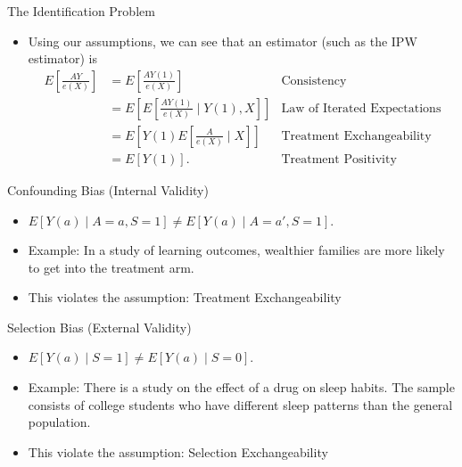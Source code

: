 \documentclass[handout]{beamer} %
\begin{document}
\begin{frame}{The Identification Problem}

\begin{itemize}
    \item Using our assumptions, we can see that an estimator (such as the 
      IPW estimator) is 
    {\small
    \begin{align*}
        E\left[\frac{AY}{e(X)}\right] 
        &= E\left[\frac{AY(1)}{e(X)}\right] & \text{Consistency}\\
        &= E\left[E\left[\frac{AY(1)}{e(X)} \mid Y(1), X\right]\right] &
        \text{Law of Iterated Expectations}\\
        &= E\left[Y(1) E\left[\frac{A}{e(X)} \mid X\right]\right]&
        \text{Treatment Exchangeability}\\
        &= E[Y(1)]. & \text{Treatment Positivity}
    \end{align*}
    }
\end{itemize}

\end{frame}

\begin{frame}{Confounding Bias (Internal Validity)}

\begin{itemize}
  \item $E[Y(a) \mid A = a, S = 1] \neq E[Y(a) \mid A = a', S = 1]$.
  \item Example: In a study of learning outcomes, wealthier families are more 
    likely to get into the treatment arm.
  \item This violates the assumption: Treatment Exchangeability
\end{itemize}

\end{frame}

\begin{frame}{Selection Bias (External Validity)}

\begin{itemize}
  \item $E[Y(a) \mid S = 1] \neq E[Y(a) \mid S = 0]$.
  \item Example: There is a study on the effect of a drug on sleep habits. The 
    sample consists of college students who have different sleep patterns than 
    the general population.
  \item This violate the assumption: Selection Exchangeability
\end{itemize}

\end{frame}
\end{document}

